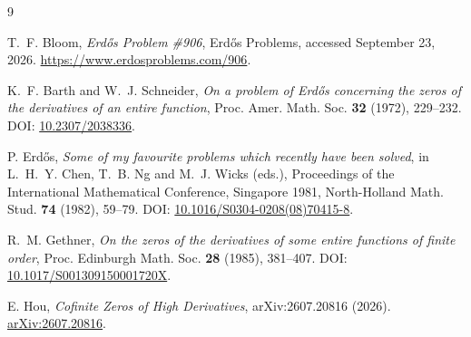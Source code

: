 \documentclass[11pt,reqno]{amsart}
\numberwithin{equation}{section}
\theoremstyle{remark}
\begin{document}
\begin{thebibliography}{9}

T.~F. Bloom,
\emph{Erd\H{o}s Problem \#906},
Erd\H{o}s Problems, accessed September 23, 2026.
\href{https://www.erdosproblems.com/906}{https://www.erdosproblems.com/906}.

K.~F. Barth and W.~J. Schneider,
\emph{On a problem of Erd\H{o}s concerning the zeros of the derivatives of an entire function},
Proc. Amer. Math. Soc. \textbf{32} (1972), 229--232.
DOI: \href{https://doi.org/10.2307/2038336}{10.2307/2038336}.

P. Erd\H{o}s,
\emph{Some of my favourite problems which recently have been solved},
in L.~H.~Y. Chen, T.~B. Ng and M.~J. Wicks (eds.),
Proceedings of the International Mathematical Conference, Singapore 1981,
North-Holland Math. Stud. \textbf{74} (1982), 59--79.
DOI: \href{https://doi.org/10.1016/S0304-0208(08)70415-8}{10.1016/S0304-0208(08)70415-8}.

R.~M. Gethner,
\emph{On the zeros of the derivatives of some entire functions of finite order},
Proc. Edinburgh Math. Soc. \textbf{28} (1985), 381--407.
DOI: \href{https://doi.org/10.1017/S001309150001720X}{10.1017/S001309150001720X}.

E. Hou,
\emph{Cofinite Zeros of High Derivatives},
arXiv:2607.20816 (2026).
\href{https://arxiv.org/abs/2607.20816}{arXiv:2607.20816}.

\end{thebibliography}
\end{document}
